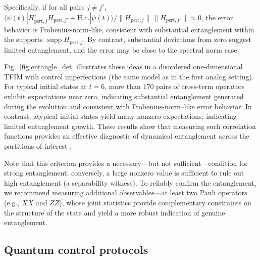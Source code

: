 \documentclass[12pt]{article}
\DeclareMathOperator{\support}{supp}
\begin{document}
Specifically, if for all pairs $j \neq j'$,
$
\langle \psi(t)| H_{\text{pert},j}^\dagger H_{\text{pert},j'} + \text{H.c.} |\psi(t) \rangle/{\|H_{\text{pert},j}\|\,\|H_{\text{pert},j'}\|} \approx 0
$, the error behavior is Frobenius-norm-like, consistent with substantial entanglement within the supports $\support{H_{\text{pert},j}}$. By contrast, substantial deviations from zero suggest limited entanglement, and the error may be close to the spectral norm case.




Fig.~\ref{fig:entangle_det} illustrates these ideas in a disordered one-dimensional TFIM with control imperfections (the same model as in the first analog setting). For typical initial states at $t=6$, more than $170$ pairs of 
cross-term operators exhibit expectations near zero,
indicating substantial entanglement generated during the evolution and consistent with Frobenius-norm--like error behavior. In contrast, atypical initial states yield many nonzero expectations, indicating limited entanglement growth. These results show that measuring such correlation functions provides an effective diagnostic of dynamical entanglement across the partitions of interest \cite{Hauke_2016}.



Note that this criterion provides a necessary---but not sufficient---condition for strong entanglement; conversely, a large nonzero value is sufficient to rule out high entanglement (a separability witness).
To reliably confirm the entanglement, we recommend measuring additional observables---at least two Pauli operators (e.g., $XX$ and $ZZ$), whose joint statistics provide complementary constraints on the structure of the state and yield a more robust indication of genuine entanglement.

















\subsection*{Quantum control protocols} 
\end{document}
